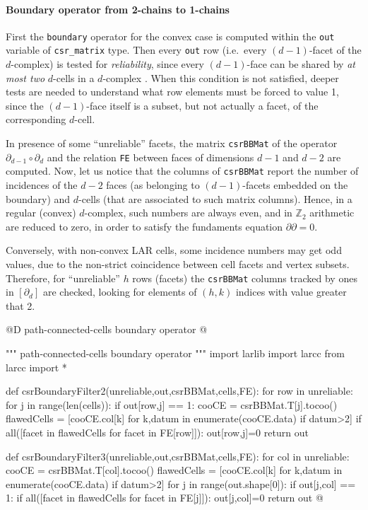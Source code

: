 \documentclass[11pt,oneside]{article}	%
\def\Z{\mathbb{Z}}
\begin{document}
\paragraph{Boundary operator from 2-chains to 1-chains}

First the \texttt{boundary} operator for the convex case is computed within the \texttt{out} variable of \texttt{csr\_matrix} type. Then every \texttt{out} row (i.e.~every $(d-1)$-facet of the $d$-complex) is tested for \emph{reliability}, since every $(d-1)$-face can be shared by \emph{at most two} $d$-cells in a $d$-complex . When this condition is not satisfied, deeper tests are needed to understand what row elements must be forced to value 1, since the $(d-1)$-face itself is a subset, but not actually a facet, of the corresponding $d$-cell. 

In presence of some ``unreliable'' facets, the matrix \texttt{csrBBMat} of the operator $\partial_{d-1}\circ\partial_d$ and the relation \texttt{FE} between faces of dimensions $d-1$ and $d-2$ are computed. Now, let us notice that the columns of \texttt{csrBBMat} report the number of incidences of the $d-2$ faces (as belonging to $(d-1)$-facets embedded on the boundary) and $d$-cells (that are associated to such matrix columns). Hence, in a regular (convex) $d$-complex, such numbers are always even, and in $\Z_2$ arithmetic are reduced to zero, in order to satisfy the fundaments equation $\partial\partial=0$. 

Conversely, with non-convex LAR cells, some incidence numbers may get odd values, due to the non-strict coincidence between cell facets and vertex subsets.
Therefore, for ``unreliable'' $h$ rows (facets) the \texttt{csrBBMat} columns tracked by ones in $[\partial_d]$ are checked, looking for elements of $(h,k)$ indices with value greater that 2.

@D path-connected-cells boundary operator
@{""" path-connected-cells boundary operator """
import larlib
import larcc
from larcc import *

def csrBoundaryFilter2(unreliable,out,csrBBMat,cells,FE):
    for row in unreliable:
        for j in range(len(cells)):
            if out[row,j] == 1:
                cooCE = csrBBMat.T[j].tocoo()
                flawedCells = [cooCE.col[k] for k,datum in enumerate(cooCE.data)
                    if datum>2]
                if all([facet in flawedCells  for facet in FE[row]]):
                    out[row,j]=0
    return out

def csrBoundaryFilter3(unreliable,out,csrBBMat,cells,FE):
    for col in unreliable:
        cooCE = csrBBMat.T[col].tocoo()
        flawedCells = [cooCE.col[k] for k,datum in enumerate(cooCE.data)
                    if datum>2]
        for j in range(out.shape[0]):
            if out[j,col] == 1:
                if all([facet in flawedCells  for facet in FE[j]]):
                    out[j,col]=0
    return out
@}
\end{document}
